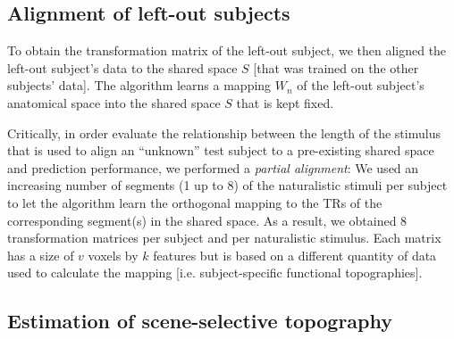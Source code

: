 \subsection{Alignment of left-out subjects}





%
To obtain the transformation matrix of the left-out subject, we then aligned the
left-out subject's data to the shared space $S$ [that was trained on the other
subjects' data].
%
The algorithm learns a mapping $W_{n}$ of the left-out subject's anatomical
space into the shared space $S$ that is kept fixed.

%
Critically, in order evaluate the relationship between the length of the
stimulus that is used to align an ``unknown'' test subject to a pre-existing
shared space and prediction performance, we performed a \textit{partial
alignment}:
%
We used an increasing number of segments (1 up to 8) of the naturalistic stimuli
per subject to let the algorithm learn the orthogonal mapping to the TRs of the
corresponding segment(s) in the shared space.
%
As a result, we obtained 8 transformation matrices per subject and per
naturalistic stimulus.
%
Each matrix has a size of $v$ voxels by $k$ features but is based on a different
quantity of data used to calculate the mapping [i.e. subject-specific functional
topographies].


\subsection{Estimation of scene-selective topography}





